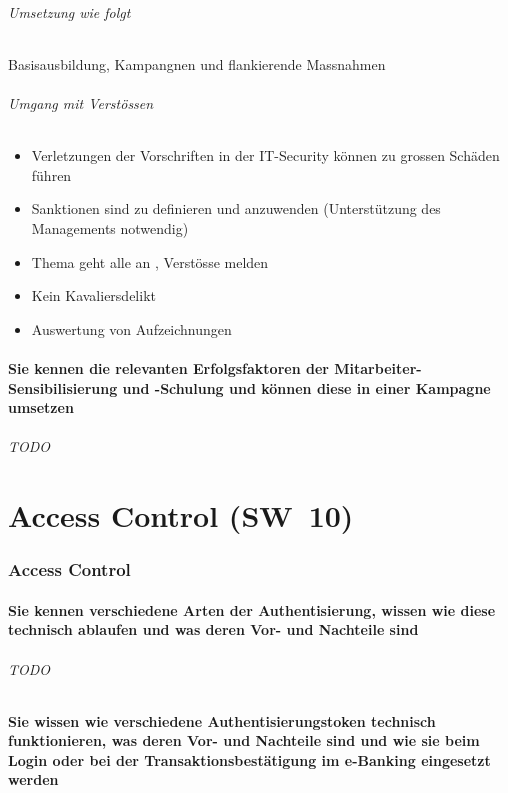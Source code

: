 \documentclass[10pt,a4paper]{article}
\begin{document}
\paragraph*{Umsetzung wie folgt} Basisausbildung, Kampangnen und flankierende Massnahmen
\paragraph*{Umgang mit Verstössen}
\begin{itemize}[noitemsep,topsep=0pt,leftmargin=*]
    \item Verletzungen der Vorschriften in der IT-Security können zu grossen Schäden führen
    \item Sanktionen sind zu definieren und anzuwenden (Unterstützung des Managements notwendig)
    \item \flqq Thema geht  alle an \frqq, Verstösse melden
    \item Kein Kavaliersdelikt
    \item Auswertung von Aufzeichnungen
\end{itemize}

\subsection*{Sie kennen die relevanten Erfolgsfaktoren der Mitarbeiter-Sensibilisierung und -Schulung und können diese in einer Kampagne umsetzen}
\paragraph*{TODO}


\part{Access Control (SW~10)}
\section{Access Control}
\subsection*{Sie kennen verschiedene Arten der Authentisierung, wissen wie diese technisch ablaufen und was deren Vor- und Nachteile sind}
\paragraph*{TODO}

\subsection*{Sie wissen wie verschiedene Authentisierungstoken technisch funktionieren, was deren Vor- und Nachteile sind und wie sie beim Login oder bei der Transaktionsbestätigung im e-Banking eingesetzt werden}
\end{document}
